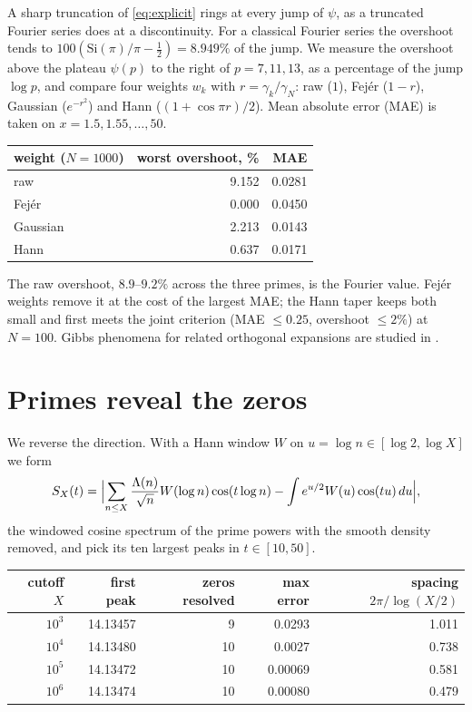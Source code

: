 \documentclass[11pt]{article}
\begin{document}
A sharp truncation of \eqref{eq:explicit} rings at every jump of $\psi$, as a truncated Fourier series does at a discontinuity. For a classical Fourier series the overshoot tends to $100(\mathrm{Si}(\pi)/\pi-\tfrac12)=8.949\%$ of the jump. We measure the overshoot above the plateau $\psi(p)$ to the right of $p=7,11,13$, as a percentage of the jump $\log p$, and compare four weights $w_k$ with $r=\gamma_k/\gamma_N$: raw ($1$), Fej\'er ($1-r$), Gaussian ($e^{-r^2}$) and Hann ($(1+\cos\pi r)/2$). Mean absolute error (MAE) is taken on $x=1.5,1.55,\dots,50$.

\begin{center}
\begin{tabular}{lrr}
\toprule
weight ($N=1000$) & worst overshoot, \% & MAE\\
\midrule
raw & 9.152 & 0.0281\\
Fej\'er & 0.000 & 0.0450\\
Gaussian & 2.213 & 0.0143\\
Hann & 0.637 & 0.0171\\
\bottomrule
\end{tabular}
\end{center}

The raw overshoot, $8.9$--$9.2\%$ across the three primes, is the Fourier value. Fej\'er weights remove it at the cost of the largest MAE; the Hann taper keeps both small and first meets the joint criterion (MAE $\le0.25$, overshoot $\le2\%$) at $N=100$. Gibbs phenomena for related orthogonal expansions are studied in \cite{davishagelstein2022}.

\section{Primes reveal the zeros}

We reverse the direction. With a Hann window $W$ on $u=\log n\in[\log2,\log X]$ we form
\[
S_X(t)=\Bigl|\sum_{n\le X}\frac{\Lambda(n)}{\sqrt n}W(\log n)\cos(t\log n)-\int e^{u/2}W(u)\cos(tu)\,du\Bigr|,
\]
the windowed cosine spectrum of the prime powers with the smooth density removed, and pick its ten largest peaks in $t\in[10,50]$.

\begin{center}
\begin{tabular}{rrrrr}
\toprule
cutoff $X$ & first peak & zeros resolved & max error & spacing $2\pi/\log(X/2)$\\
\midrule
$10^3$ & 14.13457 & 9 & 0.0293 & 1.011\\
$10^4$ & 14.13480 & 10 & 0.0027 & 0.738\\
$10^5$ & 14.13472 & 10 & 0.00069 & 0.581\\
$10^6$ & 14.13474 & 10 & 0.00080 & 0.479\\
\bottomrule
\end{tabular}
\end{center}
\end{document}
